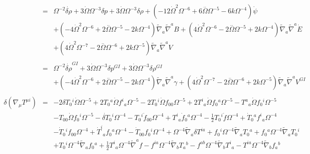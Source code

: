 \documentclass[10pt,letterpaper]{article}
\numberwithin{equation}{section}
\begin{document}
\begin{eqnarray}
\\ \nonumber\\
&=& \Omega^{-2} \dot{\delta \rho} + 3 \dot{\Omega} \Omega^{-3} \delta p + 3 \dot{\Omega} \Omega^{-3} \delta \rho + (-12 \dot{\Omega}^2 \Omega^{-6} + 6 \overset{..}{\Omega} \Omega^{-5} - 6 k \Omega^{-4}) \dot{\psi} \nonumber \\ 
&& + (-4 \dot{\Omega}^2 \Omega^{-6} + 2 \overset{..}{\Omega} \Omega^{-5} - 2 k \Omega^{-4}) \tilde{\nabla}_{a}\tilde{\nabla}^{a}B + (4 \dot{\Omega}^2 \Omega^{-6} - 2 \overset{..}{\Omega} \Omega^{-5} + 2 k \Omega^{-4}) \tilde{\nabla}_{a}\tilde{\nabla}^{a}\dot{E} \nonumber \\ 
&& + (4 \dot{\Omega}^2 \Omega^{-7} - 2 \overset{..}{\Omega} \Omega^{-6} + 2 k \Omega^{-5}) \tilde{\nabla}_{a}\tilde{\nabla}^{a}V
\\  \nonumber\\ 
&=& \Omega^{-2} \dot{\delta \rho}^{GI}{} + 3 \dot{\Omega} \Omega^{-3} \delta p^{GI}{} + 3 \dot{\Omega} \Omega^{-3} \delta \rho^{GI}{} \nonumber \\ 
&& + (-4 \dot{\Omega}^2 \Omega^{-6} + 2 \overset{..}{\Omega} \Omega^{-5} - 2 k \Omega^{-4}) \tilde{\nabla}_{a}\tilde{\nabla}^{a}\gamma +(4 \dot{\Omega}^2 \Omega^{-7} - 2 \overset{..}{\Omega} \Omega^{-6} + 2 k \Omega^{-5}) \tilde{\nabla}_{a}\tilde{\nabla}^{a}V^{GI}{}
\\ \nonumber\\
\delta(\nabla_\mu T^{\mu i})&=& -2 \delta T_{0}{}^{i} \dot{\Omega} \Omega^{-5} + 2 T_{0}{}^{a} \dot{\Omega} f^{i}{}_{a} \Omega^{-5} - 2 T_{0}{}^{i} \dot{\Omega} f_{00}{} \Omega^{-5} + 2 T^{i}{}_{a} \dot{\Omega} f_{0}{}^{a} \Omega^{-5} -  T^{a}{}_{a} \dot{\Omega} f_{0}{}^{i} \Omega^{-5} \nonumber \\ 
&& -  T_{00}{} \dot{\Omega} f_{0}{}^{i} \Omega^{-5} -  \dot{\delta T}_{0}{}^{i} \Omega^{-4} -  T_{0}{}^{i} \dot{f}_{00}{} \Omega^{-4} + T^{i}{}_{a} \dot{f}_{0}{}^{a} \Omega^{-4} -  \tfrac{1}{2} T_{0}{}^{i} \dot{f} \Omega^{-4} + \dot{T}_{0}{}^{a} f^{i}{}_{a} \Omega^{-4} \nonumber \\ 
&& -  \dot{T}_{0}{}^{i} f_{00}{} \Omega^{-4} + \dot{T}^{i}{}_{a} f_{0}{}^{a} \Omega^{-4} -  \dot{T}_{00}{} f_{0}{}^{i} \Omega^{-4} + \Omega^{-4} \tilde{\nabla}_{a}\delta T^{ia} + f_{0}{}^{i} \Omega^{-4} \tilde{\nabla}_{a}T_{0}{}^{a} + f_{0}{}^{a} \Omega^{-4} \tilde{\nabla}_{a}T_{0}{}^{i} \nonumber \\ 
&& + T_{0}{}^{i} \Omega^{-4} \tilde{\nabla}_{a}f_{0}{}^{a} + \tfrac{1}{2} T^{i}{}_{a} \Omega^{-4} \tilde{\nabla}^{a}f -  f^{ia} \Omega^{-4} \tilde{\nabla}_{b}T_{a}{}^{b} -  f^{ab} \Omega^{-4} \tilde{\nabla}_{b}T^{i}{}_{a} -  T^{ia} \Omega^{-4} \tilde{\nabla}_{b}f_{a}{}^{b} \nonumber \\ 

\end{eqnarray}
\end{document}
